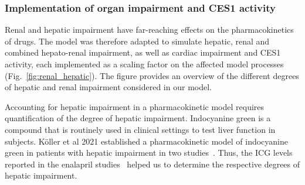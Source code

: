 \subsubsection{Implementation of organ impairment and CES1 activity}

Renal and hepatic impairment have far-reaching effects on the pharmacokinetics of drugs. The model was therefore adapted to simulate hepatic, renal and combined hepato-renal impairment, as well as cardiac impairment and CES1 activity, each implemented as a scaling factor on the affected model processes (Fig.~\ref{fig:renal_hepatic}). The figure provides an overview of the different degrees of hepatic and renal impairment considered in our model. 

Accounting for hepatic impairment in a pharmacokinetic model requires quantification of the degree of hepatic impairment. Indocyanine green is a compound that is routinely used in clinical settings to test liver function in subjects. Köller et al 2021 established a pharmacokinetic model of indocyanine green in patients with hepatic impairment in two studies~\cite{Koller2021, Koller2021a}. Thus, the ICG levels reported in the enalapril studies~\cite{Baba1989, Ohnishi1989} helped us to determine the respective degrees of hepatic impairment.

